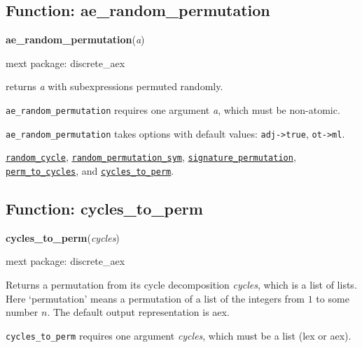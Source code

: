 \documentclass[]{article}
\begin{document}
\subsection{Function: ae\_random\_permutation\label{sec:ae_random_permutation}}
\hypertarget{ae_random_permutation}{}
{\bf ae\_random\_permutation}({\it a})


\noindent mext package: discrete\_aex



\vspace{5 pt}
returns {\it a} with subexpressions permuted randomly. 

\vspace{5 pt}

   {\tt ae\_random\_permutation} requires one argument {\it a}, which must be non-atomic.


\vspace{5 pt}

{\tt ae\_random\_permutation} takes options with default values: {\tt adj->true}, {\tt ot->ml}.
\vspace{5 pt}


  \hyperlink{random_cycle}{{\tt random\_cycle}}, \hyperlink{random_permutation_sym}{{\tt random\_permutation\_sym}}, \hyperlink{signature_permutation}{{\tt signature\_permutation}}, \hyperlink{perm_to_cycles}{{\tt perm\_to\_cycles}}, and \hyperlink{cycles_to_perm}{{\tt cycles\_to\_perm}}.

\vspace{5 pt}


\subsection{Function: cycles\_to\_perm\label{sec:cycles_to_perm}}
\hypertarget{cycles_to_perm}{}
{\bf cycles\_to\_perm}({\it cycles})


\noindent mext package: discrete\_aex



\vspace{5 pt}
Returns a permutation from its cycle decomposition {\it cycles}, which is a list of lists. Here `permutation' means a permutation of a list of the integers from $1$ to some number $n$. The default output representation is aex. 

\vspace{5 pt}

   {\tt cycles\_to\_perm} requires one argument {\it cycles}, which must be a list (lex or aex).
\end{document}
